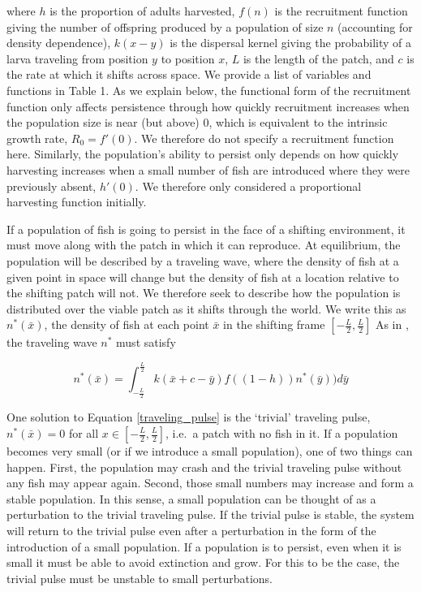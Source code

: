 \documentclass[12pt,english]{article}
\begin{document}
\begin{spacing}{1.9}
\begin{flushleft}
\noindent where $h$ is the proportion of adults harvested, $f(n)$ is the recruitment function giving the number of 
offspring produced by a population of size $n$ (accounting for density dependence), $k(x-y)$ is the dispersal kernel giving the probability of a 
larva traveling from position $y$ to position $x$, $L$ is the length of the patch, and $c$ is the rate at which it 
shifts across space. We provide a list of variables and functions in Table 1.  As we explain below, the functional form of the 
recruitment function only affects persistence through how quickly recruitment increases when the population 
size is near (but above) $0$, which is equivalent to the intrinsic growth rate, $R_0=f'(0)$. We therefore do not specify a 
recruitment function here. Similarly, the population's ability to persist only depends on how quickly harvesting 
increases when a small number of fish are introduced where they were previously absent, $h'(0)$. We 
therefore only considered a proportional harvesting function initially.

If a population of fish is going to persist in the face of a shifting environment, it must move along with the patch 
 in which it can reproduce. At equilibrium, the population will be described by a traveling wave, 
where the density of fish at a given point in space will change but the density of fish at a location relative to the 
shifting  patch will not. We therefore seek to describe how the population is distributed over the viable 
patch as it shifts through the world. We write this as $n^*(\bar{x})$, the density of fish at each point $\bar{x}$ in 
the shifting frame $\left[-\frac{L}{2}, \frac{L}{2}\right]$ As in \citet{ZhouKot2011}, the traveling wave $n^*$ must 
satisfy

\begin{equation}
n^*(\bar{x})=\int^{\frac{L}{2}}_{-\frac{L}{2}}k(\bar{x}+c-\bar{y})f((1-h))n^*(\bar{y}))d
\bar{y} \label{traveling_pulse}
\end{equation}

One solution to Equation \ref{traveling_pulse} is the `trivial' traveling pulse, $n^*(\bar{x}) = 0$ for all $x \in \left[-\frac{L}
{2}, \frac{L}{2}\right]$, i.e.~a patch with no fish in it. If a population becomes very small (or if we introduce a small 
population), one of two things can happen. First, the population may crash and the trivial traveling pulse 
without any fish may appear again. Second, those small numbers may increase and form a stable population. 
In this sense, a small population can be thought of as a perturbation to the trivial traveling pulse. If the trivial 
pulse is stable, the system will return to the trivial pulse even after a perturbation in the form of the introduction 
of a small population. If a population is to persist, even when it is small it must be able to avoid extinction and 
grow. For this to be the case, the trivial pulse must be unstable to small perturbations.  


\end{flushleft}
\end{spacing}
\end{document}
